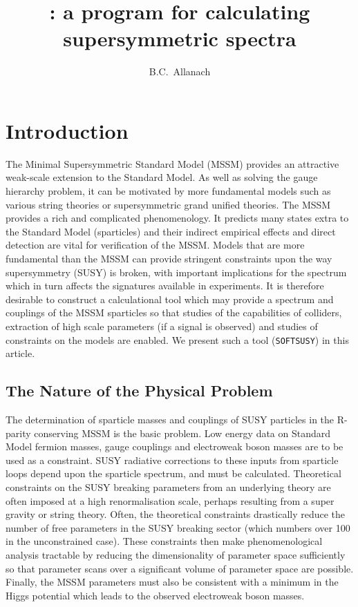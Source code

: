 \documentclass[]{article}
\title{{\SOFTSUSY}: a program for calculating supersymmetric spectra}
\author[a]{B.C.~Allanach}
\affiliation[a]{DAMTP, CMS, University of Cambridge, Wilberforce road, Cambridge, CB3 0WA,
United Kingdom}
\def\SOFTSUSY{{\tt SOFTSUSY}}
\begin{document}
\maketitle
\section{Introduction}

The Minimal Supersymmetric Standard Model (MSSM) provides an attractive
weak-scale extension to the Standard Model. As well as solving the gauge
hierarchy problem, it can be motivated by more fundamental models such as 
various string theories or supersymmetric grand unified theories. 
The MSSM provides a rich and complicated
phenomenology. It predicts many states  extra to
the Standard Model (sparticles) and
their indirect empirical 
effects and direct detection are vital for
verification of the MSSM\@.
Models that are more fundamental than
the MSSM can provide stringent constraints upon
the way supersymmetry (SUSY) is broken, with important implications for the
spectrum which in turn affects the signatures available in experiments.
It is therefore desirable to construct a calculational tool which may 
provide a spectrum and couplings of the MSSM sparticles so that studies 
of the capabilities of colliders, extraction of 
high scale parameters (if a signal is observed) and studies of constraints on
the models are enabled. We present such a tool (\SOFTSUSY) in this article.

\subsection{The Nature of the Physical Problem}

The determination of sparticle masses and couplings of SUSY particles in the
R-parity conserving MSSM is the basic problem. Low energy data on Standard
Model fermion masses,
gauge couplings and electroweak boson masses are to be used as  a constraint.
SUSY radiative corrections to these inputs from sparticle loops depend upon
the sparticle spectrum, and must be calculated.
Theoretical constraints on the SUSY breaking parameters from an underlying
theory
are often imposed at a high renormalisation scale, perhaps resulting from a
super gravity or string theory. Often, the theoretical constraints drastically
reduce the number of free parameters in the SUSY breaking sector (which
numbers over 100 in the unconstrained case). These constraints then make
phenomenological analysis tractable by reducing the dimensionality of
parameter space sufficiently so that parameter scans over a significant volume
of parameter space are possible. Finally, the MSSM parameters must also be
consistent with a minimum in the Higgs potential which leads to the observed
electroweak boson masses.
\end{document}
